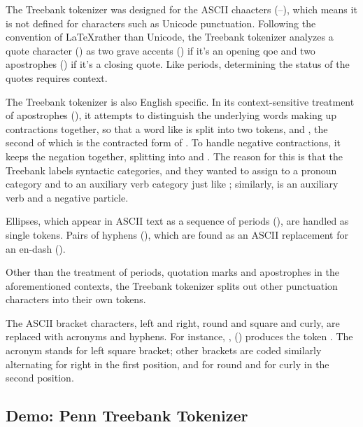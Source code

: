 The Treebank tokenizer was designed for the ASCII chaacters
(--), which means it is not defined for
characters such as Unicode punctuation.  Following the convention of
\LaTeX rather than Unicode, the Treebank tokenizer analyzes a quote
character () as two grave accents () if
it's an opening qoe and two apostrophes () if it's a
closing quote.  Like periods, determining the status of the quotes
requires context.

The Treebank tokenizer is also English specific.  In its
context-sensitive treatment of apostrophes (), it
attempts to distinguish the underlying words making up contractions
together, so that a word like  is split into two
tokens,  and , the second of which
is the contracted form of .  To handle negative
contractions, it keeps the negation together, splitting
 into  and .
The reason for this is that the Treebank labels syntactic categories,
and they wanted to assign  to a pronoun category and
 to an auxiliary verb category just like
; similarly,  is an auxiliary verb
and  a negative particle.

Ellipses, which appear in ASCII text as a sequence of periods
(), are handled as single tokens.  Pairs of hyphens
(\stringmention{{-}{-}}), which are found as an ASCII replacement for
an en-dash (\charmention{{}--{}}).

Other than the treatment of periods, quotation marks and apostrophes
in the aforementioned contexts, the Treebank tokenizer splits out
other punctuation characters into their own tokens.

The ASCII bracket characters, left and right, round and square and
curly, are replaced with acronyms and hyphens.  For instance,
,  (\charmention{[})
  produces the token .  The acronym
   stands for left square bracket; other brackets are
  coded similarly alternating  for right in the first
  position, and  for round and  for
  curly in the second position.

\subsection{Demo: Penn Treebank Tokenizer}

